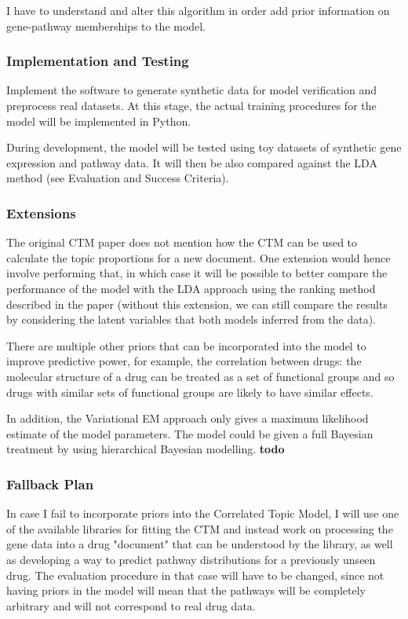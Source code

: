 \documentclass[12pt,a4]{article}
\begin{document}
I have to understand and alter this algorithm in order add prior information on gene-pathway memberships to the model.

\subsubsection*{Implementation and Testing}

Implement the software to generate synthetic data for model verification and preprocess real datasets. At this stage, the actual training procedures for the model will be implemented in Python.

During development, the model will be tested using toy datasets of synthetic gene expression and pathway data. It will then be also compared against the LDA method (see Evaluation and Success Criteria).

\subsubsection*{Extensions}
The original CTM paper does not mention how the CTM can be used to calculate the topic proportions for a new document. One extension would hence involve performing that, in which case it will be possible to better compare the performance of the model with the LDA approach using the ranking method described in the paper\cite{Pratanwanich2014} (without this extension, we can still compare the results by considering the latent variables that both models inferred from the data).

There are multiple other priors that can be incorporated into the model to improve predictive power, for example, the correlation between drugs: the molecular structure of a drug can be treated as a set of functional groups and so drugs with similar sets of functional groups are likely to have similar effects.

In addition, the Variational EM approach only gives a maximum likelihood estimate of the model parameters. The model could be given a full Bayesian treatment by using hierarchical Bayesian modelling. \textbf{todo}

\subsubsection*{Fallback Plan}
In case I fail to incorporate priors into the Correlated Topic Model, I will use one of the available libraries for fitting the CTM and instead work on processing the gene data into a drug "document" that can be understood by the library, as well as developing a way to predict pathway distributions for a previously unseen drug. The evaluation procedure in that case will have to be changed, since not having priors in the model will mean that the pathways will be completely arbitrary and will not correspond to real drug data.
\end{document}
